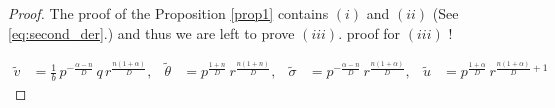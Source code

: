 \documentclass[a4paper,11pt]{article}
\def\red{\color{red}}
\def\tv{{\tilde{v}}}
\def\tth{{\tilde{\theta}}}
\def\ts{{\tilde{\sigma}}}
\def\tu{{\tilde{u}}}
\begin{document}
\begin{proof}
The proof of the Proposition \ref{prop1} contains $(i)$ and $(ii)$ (See \eqref{eq:second_der}.) and thus we are left to prove $(iii)$. {\red proof for $(iii)$ !}

% 
% 
% 
\begin{align*}
 \tv &= \frac{1}{b} \,p^{-\frac{\alpha-n}{D}} \,q\, r^{\frac{n(1+\alpha)}{D}}, & \tth&=p^{\frac{1+n}{D}}\,r^{\frac{n(1+n)}{D}}, & \ts&=p^{-\frac{\alpha-n}{D}}\,r^{\frac{n(1+\alpha)}{D}}, & \tu&=p^{\frac{1+\alpha}{D}}\,r^{\frac{n(1+\alpha)}{D}+1}
\end{align*}
% 
% 
% 
\end{proof}
\end{document}
